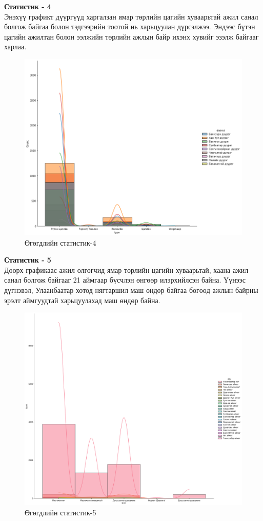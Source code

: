 \newpage
\textbf{Статистик - 4}
\\Энэхүү графикт дүүргүүд харгалзан ямар төрлийн цагийн хуваарьтай ажил санал болгож байгаа болон тэдгээрийн тоотой нь харьцуулан дүрсэлжээ. Эндээс бүтэн цагийн ажилтан болон ээлжийн төрлийн ажлын байр ихэнх хувийг эзэлж байгааг харлаа.
\begin{figure}[ht]
  \centering
  \includegraphics[width=15cm]{graphics/5.png}
  \caption{Өгөгдлийн статистик-4}
  \label{fig:statistics5}
\end{figure}
\newpage
\textbf{Статистик - 5}
\\Доорх графикаас ажил олгогчид ямар төрлийн цагийн хуваарьтай, хаана ажил санал болгож байгааг 21 аймгаар бүсчлэн өнгөөр илэрхийлсэн байна. Үүнээс дүгнэвэл, Улаанбаатар хотод нягтаршил маш өндөр байгаа бөгөөд ажлын байрны эрэлт аймгуудтай харьцуулахад маш өндөр байна.
\begin{figure}[ht]
  \centering
  \includegraphics[width=15cm]{graphics/6.png}
  \caption{Өгөгдлийн статистик-5}
  \label{fig:statistics6}
\end{figure}

